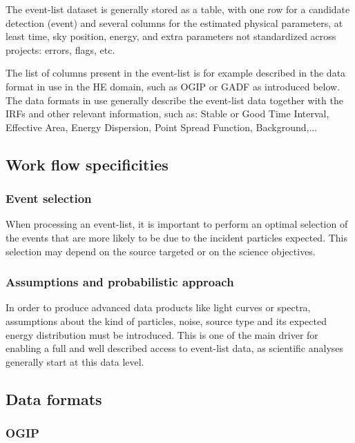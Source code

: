 \documentclass[11pt,a4paper]{ivoa}
\begin{document}
The event-list dataset is generally stored as a table, with one row for a candidate detection (event) and several columns for the estimated physical parameters, at least time, sky position, energy, and extra parameters not standardized across projects: errors, flags, etc.

The list of columns present in the event-list is for example described in the data format in use in the HE domain, such as OGIP or GADF as introduced below. The data formats in use generally describe the event-list data together with the IRFs and other relevant information, such as: Stable or Good Time Interval, Effective Area, Energy Dispersion, Point Spread Function, Background,...



\subsection{Work flow specificities}

\subsubsection{Event selection}

When processing an event-list, it is important to perform an optimal {selection of the events} that are more likely to be due to the incident particles expected. This selection may depend on the source targeted or on the science objectives.

\subsubsection{Assumptions and probabilistic approach}

In order to produce advanced data products like light curves or spectra, {assumptions} about the kind of particles, noise, source type and its expected energy distribution must be introduced. This is one of the main driver for enabling a full and well described access to event-list data, as scientific analyses generally start at this data level.


\subsection{Data formats}
\label{sec:data_formats}

\subsubsection{{OGIP}}
\end{document}
